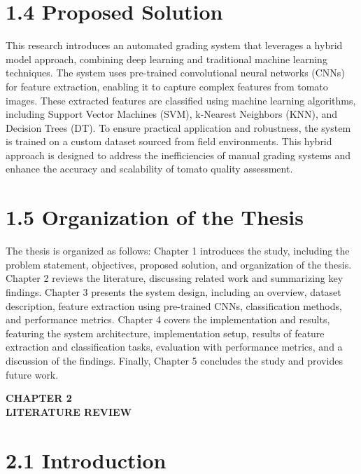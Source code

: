 \documentclass[12pt,a4paper]{report}
\begin{document}
    \section*{1.4 Proposed Solution}
    \hspace{1cm}This research introduces an automated grading system that leverages a hybrid model approach, combining deep learning and traditional machine learning techniques. The system uses pre-trained convolutional neural networks (CNNs) for feature extraction, enabling it to capture complex features from tomato images. These extracted features are classified using machine learning algorithms, including Support Vector Machines (SVM), k-Nearest Neighbors (KNN), and Decision Trees (DT). To ensure practical application and robustness, the system is trained on a custom dataset sourced from field environments. This hybrid approach is designed to address the inefficiencies of manual grading systems and enhance the accuracy and scalability of tomato quality assessment.
	
\section*{1.5 Organization of the Thesis}

\hspace{1cm}The thesis is organized as follows: Chapter 1 introduces the study, including the problem statement, objectives, proposed solution, and organization of the thesis. Chapter 2 reviews the literature, discussing related work and summarizing key findings. Chapter 3 presents the system design, including an overview, dataset description, feature extraction using pre-trained CNNs, classification methods, and performance metrics. Chapter 4 covers the implementation and results, featuring the system architecture, implementation setup, results of feature extraction and classification tasks, evaluation with performance metrics, and a discussion of the findings. Finally, Chapter 5 concludes the study and provides future work.


	
	\newpage
	
	\begin{center}
		\textbf{\Large CHAPTER 2}\\[0.5cm]
		\textbf{\Large LITERATURE REVIEW}
	\end{center}
	
\section*{2.1 Introduction}
\end{document}
